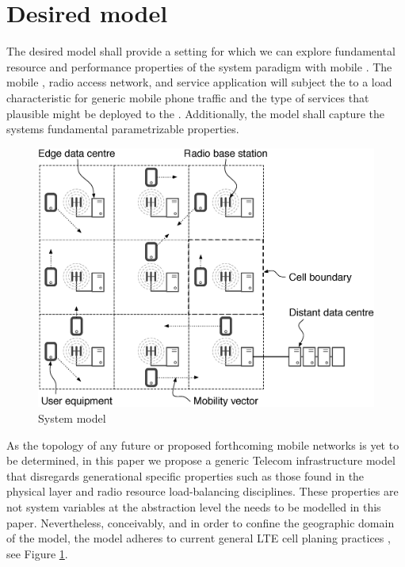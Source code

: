 \section{Desired model}
\label{sec:desiard_model}

The desired model shall provide a setting for which we can explore fundamental resource and performance properties of the \xcloud{} system paradigm with mobile \ues{}. The mobile \ues{}, radio access network, and service application will subject the \dcs{} to a load characteristic for generic mobile phone traffic and the type of services that plausible might be deployed to the \xcloud{}. Additionally, the model shall capture the systems fundamental parametrizable properties.

\begin{figure}[tb]
	\centering
	\includegraphics[width=\linewidth]{fig_system_model.eps} 
	\caption{System model}
	\label{fig:system_model}
\end{figure}

As the topology of any future \xcloud{} or proposed forthcoming mobile networks is yet to be determined, in this paper we propose a generic Telecom infrastructure model that disregards generational specific properties such as those found in the physical layer and radio resource load-balancing disciplines. These properties are not system variables at the abstraction level the \xcloud{} needs to be modelled in this paper. Nevertheless, conceivably, and in order to confine the geographic domain of the model, the model adheres to current general LTE cell planing practices \cite{salo2010practical}, see Figure \ref{fig:system_model}.

